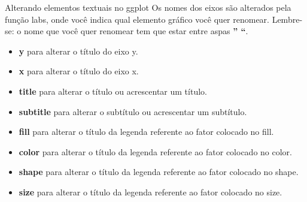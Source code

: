 \documentclass[
  ignorenonframetext,
]{beamer}
\providecommand{\tightlist}{%
  \setlength{\itemsep}{0pt}\setlength{\parskip}{0pt}}
\begin{document}
\begin{frame}{Alterando elementos textuais no ggplot}
\label{alterando-elementos-textuais-no-ggplot}
Os nomes dos eixos são alterados pela função labs, onde você indica qual
elemento gráfico você quer renomear. Lembre-se: o nome que você quer
renomear tem que estar entre aspas \textbf{'' ``}.

\begin{itemize}
\tightlist
\item
  \textbf{y} para alterar o título do eixo y.
\item
  \textbf{x} para alterar o título do eixo x.
\item
  \textbf{title} para alterar o título ou acrescentar um título.
\item
  \textbf{subtitle} para alterar o subtítulo ou acrescentar um
  subtítulo.
\item
  \textbf{fill} para alterar o título da legenda referente ao fator
  colocado no fill.
\item
  \textbf{color} para alterar o título da legenda referente ao fator
  colocado no color.
\item
  \textbf{shape} para alterar o título da legenda referente ao fator
  colocado no shape.
\item
  \textbf{size} para alterar o título da legenda referente ao fator
  colocado no size.
\end{itemize}
\end{frame}
\end{document}

